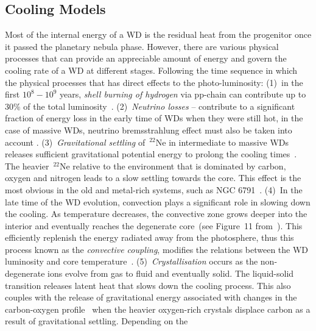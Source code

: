 \documentclass[fleqn,usenatbib]{rasti}
\begin{document}
\subsection{Cooling Models}
\label{sec:cooling_models}
Most of the internal energy of a WD is the residual heat from the progenitor
once it passed the planetary nebula phase. However, there are various physical
processes that can provide an appreciable amount of energy and govern the
cooling rate of a WD at different stages. Following the time sequence in which
the physical processes that has direct effects to the photo-luminosity: (1)~in
the first $10^8-10^9$ years, \textit{shell burning of hydrogen} via pp-chain
can contribute up to $30\%$ of the total luminosity~\citep{2010ApJ...717..183R}.
(2)~\textit{Neutrino losses} -- contribute to a significant fraction of energy
loss in the early time of WDs when they were still hot, in the case of massive
WDs, neutrino bremsstrahlung effect must also be taken into account
\citep{1994ApJ...425..222H, 1996ApJS..102..411I}. (3)~\textit{Gravitational
settling} of\ $^{22}$Ne in intermediate to massive WDs releases sufficient
gravitational potential energy to prolong the cooling
times~\citep{2002ApJ...580.1077D, 2008ApJ...677..473G, 2010ApJ...719..612A}.
The heavier\ $^{22}$Ne relative to the environment that is dominated by carbon,
oxygen and nitrogen leads to a slow settling towards the core. This effect is
the most obvious in the old and metal-rich systems, such as NGC
6791~\citep{2010Natur.465..194G, 2008ApJ...678.1279B}. (4)~In the late time of
the WD evolution, convection plays a significant role in slowing down the
cooling. As temperature decreases, the convective zone grows deeper into the
interior and eventually reaches the degenerate core~(see Figure~11
from~\citealt{2010A&ARv..18..471A}). This efficiently replenish the energy
radiated away from the photosphere, thus this process known as the
\textit{convective coupling}, modifies the relations between the WD luminosity
and core temperature~\citep{1989ApJ...347..934D, 2001PASP..113..409F}.
(5)~\textit{Crystallisation} occurs as the non-degenerate ions evolve from gas
to fluid and eventually solid. The liquid-solid transition releases latent
heat that slows down the cooling process. This also couples with the release
of gravitational energy associated with changes in the carbon-oxygen
profile~\citep{1997ApJ...486..413S} when the heavier oxygen-rich crystals
displace carbon as a result of gravitational settling. Depending on the
\end{document}
